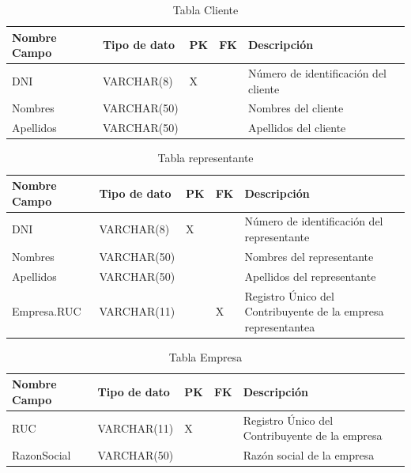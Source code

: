 \documentclass[12pt]{article}
\begin{document}
\begin{table}[htbp]
    \begin{center}
        \begin{tabular}{|p{3cm}|p{3cm}|p{1cm}|p{1cm}|p{6cm}|}
            \hline
            Nombre Campo & Tipo de dato & PK & FK & Descripción \\
            \hline
            DNI & VARCHAR(8) & X &  & Número de identificación del cliente \\
            Nombres & VARCHAR(50) &  &  & Nombres del cliente \\
            Apellidos & VARCHAR(50) &  &  & Apellidos del cliente \\
            \hline
            \end{tabular}
        \caption{Tabla Cliente}
    \end{center}
\end{table}


\begin{table}[htbp]
    \begin{center}
        \begin{tabular}{|p{3cm}|p{3cm}|p{1cm}|p{1cm}|p{6cm}|}
            \hline
            Nombre Campo & Tipo de dato & PK & FK & Descripción \\
            \hline
            DNI & VARCHAR(8) & X &  & Número de identificación del representante \\
            Nombres & VARCHAR(50) &  &  & Nombres del representante \\
            Apellidos & VARCHAR(50) &  &  & Apellidos del representante \\
            Empresa.RUC & VARCHAR(11) &  & X & Registro Único del Contribuyente de la empresa representantea \\
            \hline
            \end{tabular}
        \caption{Tabla representante}
    \end{center}
\end{table}


\begin{table}[htbp]
    \begin{center}
        \begin{tabular}{|p{3cm}|p{3cm}|p{1cm}|p{1cm}|p{6cm}|}
            \hline
            Nombre Campo & Tipo de dato & PK & FK & Descripción \\
            \hline
            RUC & VARCHAR(11) & X &  & Registro Único del Contribuyente de la empresa \\
            RazonSocial & VARCHAR(50) &  &  & Razón social de la empresa \\
            \hline
            \end{tabular}
        \caption{Tabla Empresa}
    \end{center}
\end{table}
\end{document}
